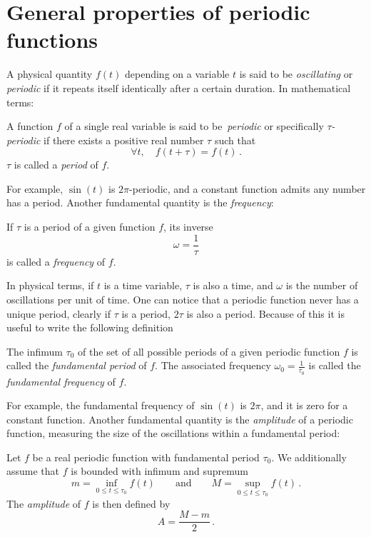 \section{General properties of periodic functions}
A physical quantity $f(t)$ depending on a variable $t$ is said to be \emph{oscillating} or
\emph{periodic} if it repeats itself identically after a certain duration. In mathematical
terms:
\begin{definition}
  A function $f$ of a single real variable is said to be~\emph{periodic} or specifically \emph{$\tau$-periodic} if there exists a positive real number $\tau$ such that
  \begin{equation}
    \forall t,\quad f(t+\tau)=f(t)\,.
  \end{equation}
  $\tau$ is called a \emph{period} of $f$.
\end{definition}
\noindent For example, $\sin(t)$ is $2\pi$-periodic, and a constant function
admits any number has a period. Another fundamental quantity is the \emph{frequency}:
\begin{definition}
  If $\tau$ is a period of a given function $f$, its inverse
  \begin{equation}
    \omega=\frac{1}{\tau}
  \end{equation}
  is called a \emph{frequency} of $f$.
\end{definition}
\noindent In physical terms, if $t$ is a time variable, $\tau$ is also a time, and $\omega$
is the number of oscillations per unit of time. One can notice that a periodic function
never has a unique period, \eg clearly if $\tau$ is a period, $2\tau$ is also a period. Because
of this it is useful to write the following definition
\begin{definition}
  The infimum $\tau_0$ of the set of all possible periods of a given periodic function $f$
  is called the \emph{fundamental period} of $f$. The associated frequency
  $\omega_0=\frac{1}{\tau_0}$ is called the \emph{fundamental frequency} of $f$.
\end{definition}
\noindent For example, the fundamental frequency of $\sin(t)$ is $2\pi$, and it is zero
for a constant function. Another fundamental quantity is the \emph{amplitude} of a
periodic function, measuring the size of the oscillations within a fundamental period:
\begin{definition}
  \label{def:amplitude}
  Let $f$ be a real periodic function with fundamental period $\tau_0$. We additionally
  assume that $f$ is bounded with infimum and supremum
  \begin{equation}
    m=\inf_{0\leq t\leq \tau_0}f(t)\qquad\text{and}\qquad M=\sup_{0\leq t\leq \tau_0}f(t)\,.
  \end{equation}
  The \emph{amplitude} of $f$ is then defined by
  \begin{equation}
    A=\frac{M-m}{2}\,.
  \end{equation}
\end{definition}
